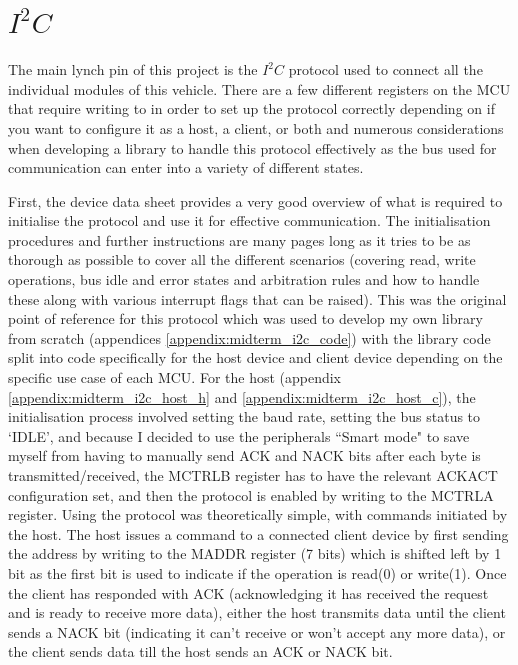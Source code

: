 \documentclass[11pt,a4paper,titlepage]{report}
\begin{document}
	\section*{$I^{2}C$}
	The main lynch pin of this project is the $I^{2}C$ protocol used to connect all the individual modules of this vehicle. There are a few different registers on the MCU that require writing to in order to set up the protocol correctly depending on if you want to configure it as a host, a client, or both and numerous considerations when developing a library to handle this protocol effectively as the bus used for communication can enter into a variety of different states. 
	
	First, the device data sheet\cite{ATTINY1627} provides a very good overview of what is required to initialise the protocol and use it for effective communication. The initialisation procedures and further instructions are many pages long as it tries to be as thorough as possible to cover all the different scenarios (covering read, write operations, bus idle and error states and arbitration rules and how to handle these along with various interrupt flags that can be raised). This was the original point of reference for this protocol which was used to develop my own library from scratch (appendices \ref{appendix:midterm_i2c_code}) with the library code split into code specifically for the host device and client device depending on the specific use case of each MCU. For the host (appendix \ref{appendix:midterm_i2c_host_h} and \ref{appendix:midterm_i2c_host_c}), the initialisation process involved setting the baud rate, setting the bus status to `IDLE', and because I decided to use the peripherals ``Smart mode" to save myself from having to manually send ACK and NACK bits after each byte is transmitted/received, the MCTRLB register has to have the relevant ACKACT configuration set, and then the protocol is enabled by writing to the MCTRLA register. Using the protocol was theoretically simple, with commands initiated by the host. The host issues a command to a connected client device by first sending the address by writing to the MADDR register (7 bits) which is shifted left by 1 bit as the first bit is used to indicate if the operation is read(0) or write(1). Once the client has responded with ACK (acknowledging it has received the request and is ready to receive more data), either the host transmits data until the client sends a NACK bit (indicating it can't receive or won't accept any more data), or the client sends data till the host sends an ACK or NACK bit. 
	
\end{document}
